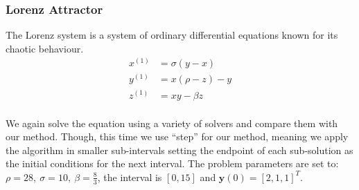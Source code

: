 \documentclass[11pt]{report}
\begin{document}
    \subsubsection{Lorenz Attractor}
    The Lorenz system is a system of ordinary differential equations known for its chaotic behaviour.
    \begin{align*}
        x^{(1)}&= \sigma( y - x ) \\
        y^{(1)}&=  x( \rho - z) - y \\
        z^{(1)}&=  xy - \beta z\\
    \end{align*}

    We again solve the equation using a variety of solvers and compare them with our method.
    Though, this time we use ``step'' for our method, meaning we apply the algorithm in smaller sub-intervals setting
    the endpoint of each sub-solution as the initial conditions for the next interval.
    The problem parameters are set to: $\rho = 28, \ \sigma=10,\ \beta = \frac{8}{3}$, the interval is $[0, 15]$ and
    $\pmb{y}(0) = [2, 1 ,1]^T $.
\end{document}

